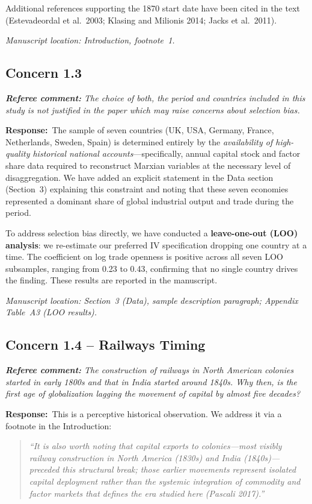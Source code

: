 \documentclass[11pt]{article}
\newcommand{\RC}[1]{\begin{refereebox}\textit{\textbf{Referee comment:} #1}\end{refereebox}}
\newcommand{\AR}{\noindent\textbf{Response:}\ }
\begin{document}
Additional references supporting the 1870 start date have been cited in the text (Estevadeordal et al.\ 2003; Klasing and Milionis 2014; Jacks et al.\ 2011).

\smallskip\noindent\textit{Manuscript location: Introduction, footnote~1.}

\subsection*{Concern 1.3}

\RC{The choice of both, the period and countries included in this study is not justified in the paper which may raise concerns about selection bias.}

\AR The sample of seven countries (UK, USA, Germany, France, Netherlands, Sweden, Spain) is determined entirely by the \emph{availability of high-quality historical national accounts}---specifically, annual capital stock and factor share data required to reconstruct Marxian variables at the necessary level of disaggregation. We have added an explicit statement in the Data section (Section~3) explaining this constraint and noting that these seven economies represented a dominant share of global industrial output and trade during the period.

To address selection bias directly, we have conducted a \textbf{leave-one-out (LOO) analysis}: we re-estimate our preferred IV specification dropping one country at a time. The coefficient on log trade openness is positive across all seven LOO subsamples, ranging from 0.23 to 0.43, confirming that no single country drives the finding. These results are reported in the manuscript.

\smallskip\noindent\textit{Manuscript location: Section~3 (Data), sample description paragraph; Appendix Table~A3 (LOO results).}

\subsection*{Concern 1.4 -- Railways Timing}

\RC{The construction of railways in North American colonies started in early 1800s and that in India started around 1840s. Why then, is the first age of globalization lagging the movement of capital by almost five decades?}

\AR This is a perceptive historical observation. We address it via a footnote in the Introduction:

\begin{quote}
\textit{``It is also worth noting that capital exports to colonies---most visibly railway construction in North America (1830s) and India (1840s)---preceded this structural break; those earlier movements represent isolated capital deployment rather than the systemic integration of commodity and factor markets that defines the era studied here (Pascali 2017).''}
\end{quote}
\end{document}
